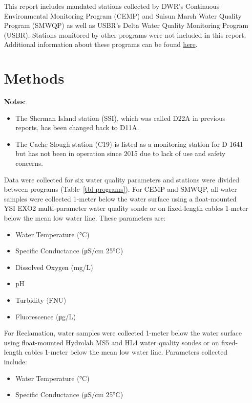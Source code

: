 \documentclass[
  letterpaper,
]{article}
\providecommand{\tightlist}{%
  \setlength{\itemsep}{0pt}\setlength{\parskip}{0pt}}
\begin{document}
This report includes mandated stations collected by DWR's Continuous
Environmental Monitoring Program (CEMP) and Suisun Marsh Water Quality
Program (SMWQP) as well as USBR's Delta Water Quality Monitoring Program
(USBR). Stations monitored by other programs were not included in this
report. Additional information about these programs can be found
\href{https://emp-dwr.github.io/emp-website/qmd-files/website/cwq/cwq-info.html}{here}.

\section{Methods}\label{methods}

\textbf{Notes}:

\begin{itemize}
\item
  The Sherman Island station (SSI), which was called D22A in previous
  reports, has been changed back to D11A.
\item
  The Cache Slough station (C19) is listed as a monitoring station for
  D-1641 but has not been in operation since 2015 due to lack of use and
  safety concerns.
\end{itemize}

Data were collected for six water quality parameters and stations were
divided between programs (Table~\ref{tbl-programs}). For CEMP and SMWQP,
all water samples were collected 1-meter below the water surface using a
float-mounted YSI EXO2 multi-parameter water quality sonde or on
fixed-length cables 1-meter below the mean low water line. These
parameters are:

\begin{itemize}
\tightlist
\item
  Water Temperature (°C)
\item
  Specific Conductance (μS/cm 25°C)
\item
  Dissolved Oxygen (mg/L)
\item
  pH
\item
  Turbidity (FNU)
\item
  Fluorescence (μg/L)
\end{itemize}

For Reclamation, water samples were collected 1-meter below the water
surface using float-mounted Hydrolab MS5 and HL4 water quality sondes or
on fixed-length cables 1-meter below the mean low water line. Parameters
collected include:

\begin{itemize}
\tightlist
\item
  Water Temperature (°C)
\item
  Specific Conductance (μS/cm 25°C)
\end{itemize}
\end{document}
